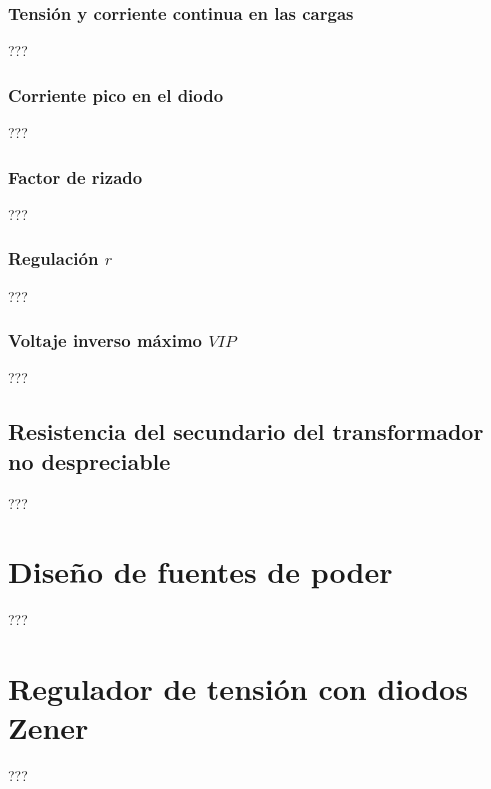 \subsubsection{Tensión y corriente continua en las cargas}
???
\subsubsection{Corriente pico en el diodo}
???
\subsubsection{Factor de rizado}
???
\subsubsection{Regulación $r$}
???
\subsubsection{Voltaje inverso máximo $VIP$}
???
\subsection{Resistencia del secundario del transformador no despreciable}
???
\section{Diseño de fuentes de poder}
???
\section{Regulador de tensión con diodos Zener}
???